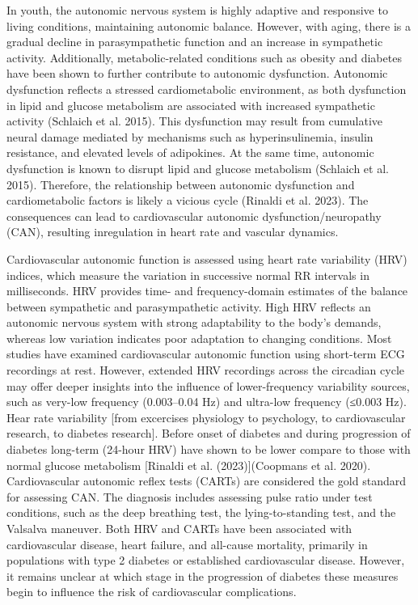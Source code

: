 \documentclass[
  a4paper,
  headsepline=true,
  open=any]{scrbook}
\begin{document}
In youth, the autonomic nervous system is highly adaptive and responsive
to living conditions, maintaining autonomic balance. However, with
aging, there is a gradual decline in parasympathetic function and an
increase in sympathetic activity. Additionally, metabolic-related
conditions such as obesity and diabetes have been shown to further
contribute to autonomic dysfunction. Autonomic dysfunction reflects a
stressed cardiometabolic environment, as both dysfunction in lipid and
glucose metabolism are associated with increased sympathetic activity
(Schlaich et al. 2015). This dysfunction may result from cumulative
neural damage mediated by mechanisms such as hyperinsulinemia, insulin
resistance, and elevated levels of adipokines. At the same time,
autonomic dysfunction is known to disrupt lipid and glucose metabolism
(Schlaich et al. 2015). Therefore, the relationship between autonomic
dysfunction and cardiometabolic factors is likely a vicious cycle
(Rinaldi et al. 2023). The consequences can lead to cardiovascular
autonomic dysfunction/neuropathy (CAN), resulting inregulation in heart
rate and vascular dynamics.

Cardiovascular autonomic function is assessed using heart rate
variability (HRV) indices, which measure the variation in successive
normal RR intervals in milliseconds. HRV provides time- and
frequency-domain estimates of the balance between sympathetic and
parasympathetic activity. High HRV reflects an autonomic nervous system
with strong adaptability to the body's demands, whereas low variation
indicates poor adaptation to changing conditions. Most studies have
examined cardiovascular autonomic function using short-term ECG
recordings at rest. However, extended HRV recordings across the
circadian cycle may offer deeper insights into the influence of
lower-frequency variability sources, such as very-low frequency
(0.003--0.04 Hz) and ultra-low frequency (≤0.003 Hz). Hear rate
variability {[}from excercises physiology to psychology, to
cardiovascular research, to diabetes research{]}. Before onset of
diabetes and during progression of diabetes long-term (24-hour HRV) have
shown to be lower compare to those with normal glucose metabolism
{[}Rinaldi et al. (2023){]}(Coopmans et al. 2020). Cardiovascular
autonomic reflex tests (CARTs) are considered the gold standard for
assessing CAN. The diagnosis includes assessing pulse ratio under test
conditions, such as the deep breathing test, the lying-to-standing test,
and the Valsalva maneuver. Both HRV and CARTs have been associated with
cardiovascular disease, heart failure, and all-cause mortality,
primarily in populations with type 2 diabetes or established
cardiovascular disease. However, it remains unclear at which stage in
the progression of diabetes these measures begin to influence the risk
of cardiovascular complications.
\end{document}
